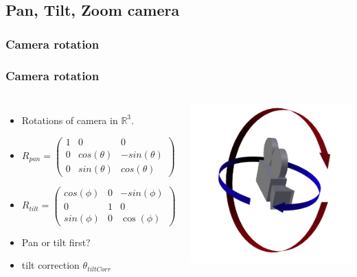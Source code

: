 \documentclass[9pt]{beamer}
\begin{document}
\subsection{Pan, Tilt, Zoom camera}
\subsubsection{Camera rotation}
\begin{frame}
	\frametitle{Camera rotation}
	\begin{columns}
		\begin{itemize}
			\item Rotations of camera in $\mathbb{R}^3$.
			\item $R_{pan}=\begin{pmatrix}
						1 & 0 & 0\\
						0 & cos(\theta) & -sin(\theta)\\
						0 & sin(\theta) & cos(\theta)
					\end{pmatrix}$
			\item $R_{tilt}=\begin{pmatrix}
						cos(\phi) & 0 & -sin(\phi)\\
						0 & 1 & 0 \\
						sin(\phi) & 0 & \cos(\phi)
					\end{pmatrix}$
			\item  Pan or tilt first?
			\item  tilt correction $\theta_{tiltCorr}$
		\end{itemize}
		\includegraphics[width=\columnwidth]{../results/images/TiltPan.png}\\

\end{columns}
\end{frame}
\end{document}
